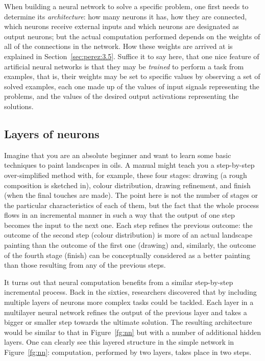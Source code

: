 \documentclass[output=paper,colorlinks,citecolor=brown]{langscibook}
\begin{document}
When building a neural network to solve a specific problem, one first needs to determine its \emph{architecture}: how many neurons it has, how they are connected, which neurons receive external inputs and which neurons are designated as output neurons; but the actual computation performed depends on the weights of all of the connections in the network. How these weights are arrived at is explained in Section~\ref{sec:perez:3.5}. Suffice it to say here, that one nice feature of artificial neural networks is that they may be \emph{trained} to perform a task from examples, that is, their weights may be set to specific values by observing a set of solved examples, each one made up of the values of input signals representing the problems, and the values of the desired output activations representing the solutions.

\subsection{Layers of neurons}
\label{sec:layers}
Imagine that you are an absolute beginner and want to learn some basic techniques to paint landscapes in oils. A manual might teach you a step-by-step over-simplified method with, for example, these four stages: drawing (a rough composition is sketched in), colour distribution, drawing refinement, and finish (when the final touches are made).
The point here is not the number of stages or the particular characteristics of each of them, 
but the fact that the whole process flows in an incremental manner in such a way that the output of one step becomes the input to the next one. 
Each step refines the previous outcome: the outcome of the second step (colour distribution) is more of an actual landscape painting than the outcome of the first one (drawing) and, similarly, the outcome of the fourth stage (finish) can be conceptually considered as a better painting than those resulting from any of the previous steps.

It turns out that neural computation benefits from a similar step-by-step incremental process. Back in the sixties,
researchers discovered that by including multiple layers of neurons more complex tasks could be tackled. Each layer in a multilayer neural network refines the output of the previous layer and takes a bigger or smaller step towards the ultimate solution. The resulting architecture would be similar to that in Figure~\ref{fg:nn} but with a number of additional hidden layers. One can clearly see this layered structure in the simple network in Figure~\ref{fg:nn}: computation, performed by two layers, takes place in two steps.
\end{document}
